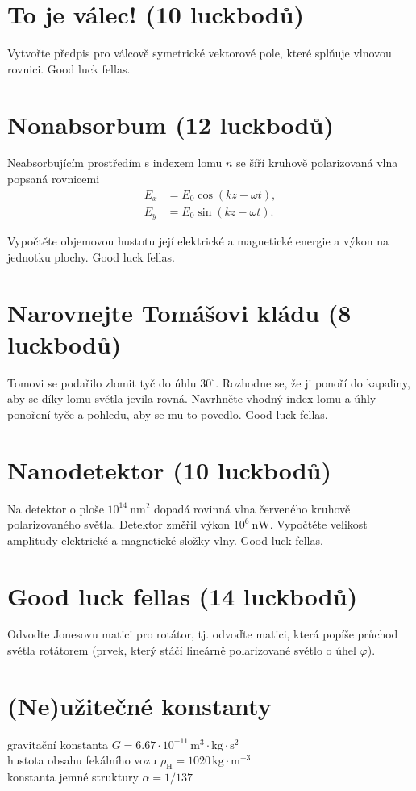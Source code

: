 \documentclass[11pt,a4paper,landscape]{article}
\begin{document}
\begin{multicols}{2}[]
\section{To je válec! (10 luckbodů)}
Vytvořte předpis pro válcově symetrické vektorové pole, které splňuje vlnovou rovnici. Good luck fellas.

\section{Nonabsorbum (12 luckbodů)}

Neabsorbujícím prostředím s indexem lomu $n$ se šíří kruhově polarizovaná vlna popsaná rovnicemi
\begin{subequations}
\begin{align}
E_x &= E_0\cos{\left(kz - \omega t\right)},\\
E_y &= E_0\sin{\left(kz - \omega t\right)}.
\end{align}
\end{subequations}

Vypočtěte objemovou hustotu její elektrické a magnetické energie a výkon na jednotku plochy. Good luck fellas.

\section{Narovnejte Tomášovi kládu (8 luckbodů)}
Tomovi se podařilo zlomit tyč do úhlu $30^{\circ}$. Rozhodne se, že ji ponoří do kapaliny, aby se díky lomu světla jevila rovná. Navrhněte vhodný index lomu a úhly ponoření tyče a pohledu, aby se mu to povedlo. Good luck fellas.

\section{Nanodetektor (10 luckbodů)}
 Na detektor o ploše $10^{14}~\mathrm{nm^2}$ dopadá rovinná vlna červeného kruhově polarizovaného světla. Detektor změřil výkon $10^6~\mathrm{nW}$. Vypočtěte velikost amplitudy elektrické a magnetické složky vlny. Good luck fellas.

\section{Good luck fellas (14 luckbodů)}

Odvoďte Jonesovu matici pro rotátor, tj. odvoďte matici, která popíše průchod světla rotátorem (prvek, který stáčí lineárně polarizované světlo o úhel $\varphi$).

\section*{(Ne)užitečné konstanty}
gravitační konstanta $G = 6.67\cdot 10^{-11}\, \mathrm{m}^3\cdot\mathrm{kg}\cdot \mathrm{s}^2$\\
hustota obsahu fekálního vozu $\rho_{\mathrm{H}} = 1020\,\mathrm{kg}\cdot\mathrm{m}^{-3}$\\
konstanta jemné struktury $\alpha = 1/137$

\end{multicols}
\end{document}
